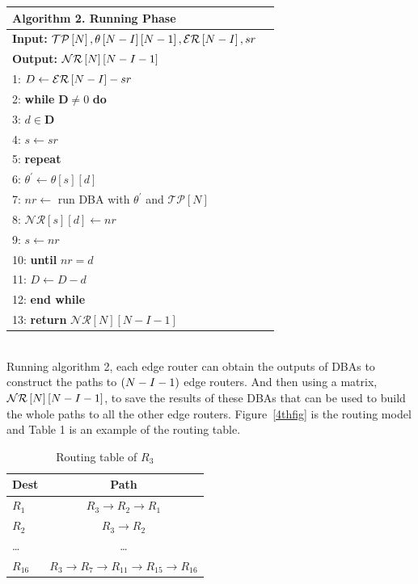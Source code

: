 \documentclass[11pt]{report}
\begin{document}
	\begin{tabular}{ll}
		\toprule
		\textbf{Algorithm 2}. Running Phase\\
		\hline
		\textbf{Input:} $\mathcal{TP}\left[N\right], \theta\left[\mathnormal{N} - \mathnormal{I}\right]\left[\mathnormal{N} - 1\right], \mathcal{ER}\left[\mathnormal{N} - \mathnormal{I}\right], sr$\\
		\textbf{Output:} $\mathcal{NR}\left[\mathnormal{N}\right]\left[\mathnormal{N} - \mathnormal{I} -1\right]$\\
		\hline
		1: $D \gets \mathcal{ER}\left[\mathnormal{N} - \mathnormal{I}\right] - sr$\\
		2: \textbf{while} $\textbf{D} \ne 0$ \textbf{do}\\
		3:  \quad $d \in \textbf{D}$\\
		4:  \quad $s \gets sr$\\
		5:  \quad \textbf{repeat}\\
		6:  \quad\quad $\theta^{'} \gets \theta\left[s\right]\left[d\right]$\\
		7:  \quad\quad $nr \gets$ run DBA with $\theta^{'}$ and $\mathcal{TP}\left[N\right]$\\
		8:  \quad\quad $\mathcal{NR}\left[s\right]\left[d\right] \gets nr$\\
		9:  \quad $s \gets nr$\\
		10: \textbf{until} $nr = d$\\
		11:  $D \gets D - d$\\
		12: \textbf{end while}\\
		13: \textbf{return} $\mathcal{NR}\left[N\right]\left[N - I -1\right]$\\
		\hline
	\end{tabular}\\

	\noindent Running algorithm 2, each edge router can obtain the outputs of DBAs to construct the paths to $\left(\mathnormal{N} - \mathnormal{I} - 1\right)$ edge routers. And then using a matrix, $\mathcal{NR}\left[\mathnormal{N}\right]\left[\mathnormal{N} - \mathnormal{I} - 1\right]$, to save the results of these DBAs that can be used to build the whole paths to all the other edge routers. Figure~\ref{4thfig} is the routing model and Table 1 is an example of the routing table.\\

	\begin{table}[!h]
		\centering
		\caption{Routing table of $R_3$}
		\begin{tabular}{lc}
			\toprule
			Dest& Path\\
			\hline
			$R_1$& $R_3 \to R_2 \to R_1$\\
			$R_2$& $R_3 \to R_2$\\
			\dots& \dots\\
			$R_{16}$& $R_3 \to R_7 \to R_{11} \to R_{15} \to R_{16}$\\
			\hline
		\end{tabular}
	\end{table}
\end{document}
